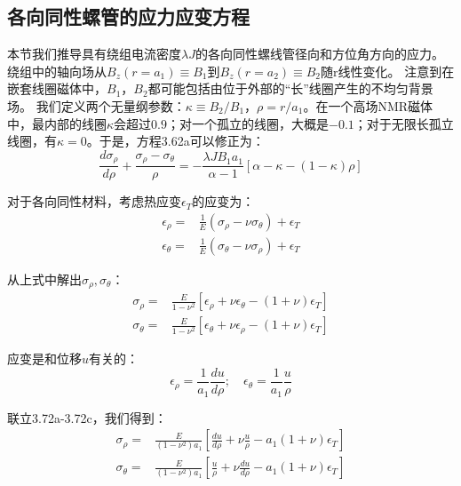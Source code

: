 \subsection{各向同性螺管的应力应变方程}
本节我们推导具有绕组电流密度$\lambda J$的各向同性螺线管径向和方位角方向的应力。
绕组中的轴向场从$B_z(r = a_1)\equiv B_1$到$B_z(r = a_2)\equiv B_2$随r线性变化。
注意到在嵌套线圈磁体中，$B_1，B_2$都可能包括由位于外部的“长”线圈产生的不均匀背景场。
我们定义两个无量纲参数：$\kappa\equiv B_2/B_1，\rho = r/a_1$。在一个高场NMR磁体中，最内部的线圈$\kappa$会超过$0.9$；对一个孤立的线圈，大概是$-0.1$；对于无限长孤立线圈，有$\kappa=0$。于是，方程3.62a可以修正为：
\begin{equation}
\frac{d\sigma_{\rho}}{d\rho}+\frac{\sigma_\rho-\sigma_\theta}{\rho}=-\frac{\lambda JB_1a_1}{\alpha-1}[\alpha-\kappa-(1-\kappa)\rho]
\end{equation}

对于各向同性材料，考虑热应变$\epsilon_T$的应变为：
\begin{subequations}
	\begin{align}
\epsilon_\rho=&\frac{1}{E}(\sigma_\rho-\nu\sigma_\theta)+\epsilon_T\\
\epsilon_\theta=&\frac{1}{E}(\sigma_\theta-\nu\sigma_\rho)+\epsilon_T
	\end{align}
\end{subequations}

从上式中解出$\sigma_\rho,\sigma_{\theta}$：
\begin{subequations}
	\begin{align}
\sigma_\rho=&\frac{E}{1-\nu^2}[\epsilon_\rho+\nu\epsilon_\theta-(1+\nu)\epsilon_T]\\
\sigma_\theta=&\frac{E}{1-\nu^2}[\epsilon_\theta+\nu\epsilon_\rho-(1+\nu)\epsilon_T]
	\end{align}
\end{subequations}

应变是和位移$u$有关的：
\begin{equation*}
\epsilon_\rho=\frac{1}{a_1}\frac{du}{d\rho};\quad \epsilon_\theta=\frac{1}{a_1}\frac{u}{\rho} \tag{3.72c}
\end{equation*}

联立3.72a-3.72c，我们得到：
\begin{align*}
\sigma_\rho=&\frac{E}{(1-\nu^2)a_1}[\frac{du}{d\rho}+\nu\frac{u}{\rho}-a_1(1+\nu)\epsilon_T]\tag{3.72d}\\ 
\sigma_\theta=&\frac{E}{(1-\nu^2)a_1}[\frac{u}{\rho}+\nu\frac{du}{d\rho}-a_1(1+\nu)\epsilon_T] \tag{3.72e}
\end{align*}

